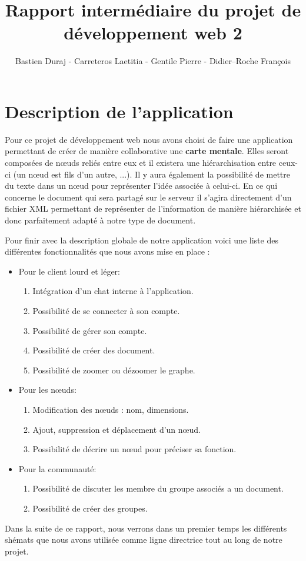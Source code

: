 \documentclass[11pt,a4paper]{article}
\author{Bastien Duraj - Carreteros Laetitia - Gentile Pierre - Didier--Roche François}
\title{Rapport intermédiaire du projet de développement web 2}
\begin{document}
\maketitle
\newpage

\tableofcontents
\newpage

\section{Description de l'application}
Pour ce projet de développement web nous avons choisi de faire une application permettant de créer de manière collaborative une \textbf{carte mentale}. Elles seront composées de nœuds reliés entre eux et il existera une hiérarchisation entre ceux-ci (un nœud est fils d'un autre, ...). Il y aura également la possibilité de mettre du texte dans un nœud pour représenter l'idée associée à celui-ci. 
En ce qui concerne le document qui sera partagé sur le serveur il s'agira directement d'un fichier XML permettant de représenter de l'information de manière hiérarchisée et donc parfaitement adapté à notre type de document. 

Pour finir avec la description globale de notre application voici une
liste des différentes fonctionnalités que nous avons mise en place :
\begin{itemize}
\item Pour le client lourd et léger:
	\begin{enumerate}
     	\item Intégration d'un chat interne à l'application.
     	\item Possibilité de se connecter à son compte.
     	\item Possibilité de gérer son compte.
     	\item Possibilité de créer des document.
     	\item Possibilité de zoomer ou dézoomer le graphe.
	\end{enumerate}
\item Pour les nœuds:
	\begin{enumerate}
     	\item Modification des nœuds : nom, dimensions.
     	\item Ajout, suppression et déplacement d'un nœud.
     	\item Possibilité de décrire un nœud pour préciser sa fonction.
	\end{enumerate}
\item Pour la communauté:
	\begin{enumerate}
     	\item Possibilité de discuter les membre du groupe associés a
          un document.
     	\item Possibilité de créer des groupes.
	\end{enumerate}
\end{itemize}
Dans la suite de ce rapport, nous verrons dans un premier temps les
différents shémats que nous avons utilisée comme ligne directrice tout
au long de notre projet.
\end{document}
